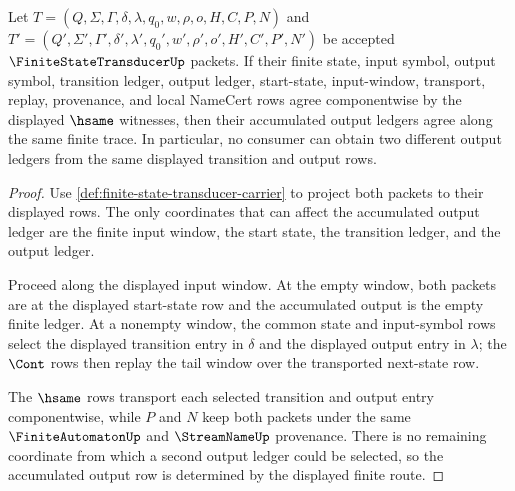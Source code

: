 \begin{theorem}
\label{thm:finite-state-transducer-output-ledger-determinacy}
Let $T=(Q,\Sigma,\Gamma,\delta,\lambda,q_0,w,\rho,o,H,C,P,N)$ and $T'=(Q',\Sigma',\Gamma',\delta',\lambda',q_0',w',\rho',o',H',C',P',N')$ be accepted $\FiniteStateTransducerUp$ packets. If their finite state, input symbol, output symbol, transition ledger, output ledger, start-state, input-window, transport, replay, provenance, and local NameCert rows agree componentwise by the displayed $\hsame$ witnesses, then their accumulated output ledgers agree along the same finite trace. In particular, no consumer can obtain two different output ledgers from the same displayed transition and output rows.
\end{theorem}
\begin{proof}
Use \autoref{def:finite-state-transducer-carrier} to project both packets to their displayed rows. The only coordinates that can affect the accumulated output ledger are the finite input window, the start state, the transition ledger, and the output ledger.

Proceed along the displayed input window. At the empty window, both packets are at the displayed start-state row and the accumulated output is the empty finite ledger. At a nonempty window, the common state and input-symbol rows select the displayed transition entry in $\delta$ and the displayed output entry in $\lambda$; the $\Cont$ rows then replay the tail window over the transported next-state row.

The $\hsame$ rows transport each selected transition and output entry componentwise, while $P$ and $N$ keep both packets under the same $\FiniteAutomatonUp$ and $\StreamNameUp$ provenance. There is no remaining coordinate from which a second output ledger could be selected, so the accumulated output row is determined by the displayed finite route.
\end{proof}

